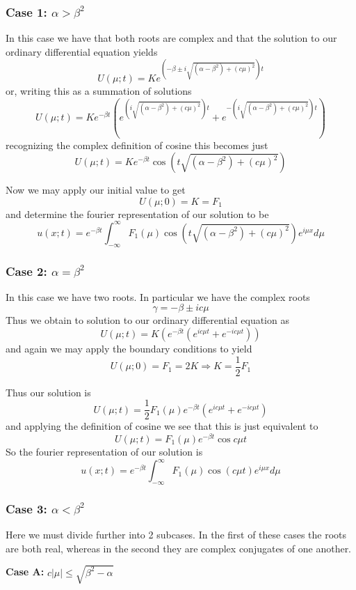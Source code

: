 \documentclass[12pt]{article}
\begin{document}
\subsubsection{Case 1: $\alpha>\beta^2$}
In this case we have that both roots are complex and that the solution to our ordinary differential equation yields
\[U(\mu;t)=K e^{ \left(-\beta \pm i \sqrt{(\alpha-\beta^2)+(c\mu)^2} \right)t}\]
or, writing this as a summation of solutions
\[U(\mu;t)=K e^{ -\beta t} \left( e^{\left(i \sqrt{(\alpha-\beta^2)+(c\mu)^2} \right)t} +  e^{-\left(i \sqrt{(\alpha-\beta^2)+(c\mu)^2} \right)t}  \right)\]
recognizing the complex definition of cosine this becomes just
\[U(\mu;t)=K e^{ -\beta t}  \cos{\left(t \sqrt{(\alpha-\beta^2)+(c\mu)^2} \right) } \]

Now we may apply our initial value to get
\[U(\mu;0)=K = F_1 \]
and determine the fourier representation of our solution to be
\[u(x;t)=e^{-\beta t } \int_{-\infty}^{\infty} F_1(\mu) \cos{\left(t \sqrt{(\alpha-\beta^2)+(c\mu)^2}  \right)} e^{i \mu x} d\mu\]

\subsubsection{Case 2: $\alpha = \beta^2$}
In this case we have two roots. In particular we have the complex roots 
\[\gamma = -\beta \pm i c \mu \]
Thus we obtain to solution to our ordinary differential equation as 
\[ U(\mu;t)=K \left( e^{-\beta t} \left( e^{i c \mu t}+ e^{-i c \mu t}\right) \right)\]
and again we may apply the boundary conditions to yield
\[U(\mu; 0) = F_1  = 2 K \Rightarrow K = \frac{1}{2} F_1 \]

Thus our solution is
\[U(\mu;t)= \frac{1}{2} F_1(\mu) e^{-\beta t} \left( e^{i c \mu t} + e^{-i c \mu t} \right) \]
and applying the definition of cosine we see that this is just equivalent to 
\[U(\mu;t)=F_1(\mu)e^{-\beta t}\cos{c \mu t}\]
So the fourier representation of our solution is 
\[u(x;t)= e^{-\beta t} \int_{-\infty}^\infty F_1(\mu) \cos{\left( c \mu t\right)} e^{i \mu x} d\mu\]

\subsubsection{Case 3: $\alpha < \beta^2$}
Here we must divide further into 2 subcases. In the first of these cases the roots are both real, whereas in the second they are complex conjugates of one another.


\textbf{Case A: } $c|\mu| \leq \sqrt{\beta^2 - \alpha}$
\end{document}
